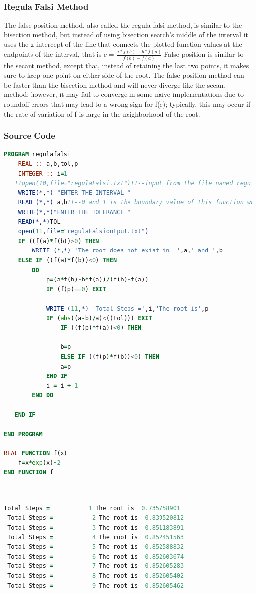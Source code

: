 \documentclass{article}
\begin{document}
\subsubsection{Regula Falsi Method}
The false position method, also called the regula falsi method, is similar to the bisection method, but instead of using bisection search's middle of the interval it uses the x-intercept of the line that connects the plotted function values at the endpoints of the interval, that is $ c = \frac{a*f(b)-b*f(a)}{f(b)-f(a)}$
False position is similar to the secant method, except that, instead of retaining the last two points, it makes sure to keep one point on either side of the root. The false position method can be faster than the bisection method and will never diverge like the secant method; however, it may fail to converge in some naive implementations due to roundoff errors that may lead to a wrong sign for f(c); typically, this may occur if the rate of variation of f is large in the neighborhood of the root.
\subsubsection{Source Code}
\begin{lstlisting}[language=Fortran,caption=Regula Falsi]
PROGRAM regulafalsi
    REAL :: a,b,tol,p
    INTEGER :: i=1
   !!open(10,file="regulaFalsi.txt")!!--input from the file named regula falsi.txt--!!
    WRITE(*,*) "ENTER THE INTERVAL "
    READ (*,*) a,b!!--0 and 1 is the boundary value of this function where the root lies and tol is tolerance upto--!!
    WRITE(*,*)"ENTER THE TOLERANCE "
    READ(*,*)TOL
    open(11,file="regulaFalsioutput.txt")
    IF ((f(a)*f(b))>0) THEN
        WRITE (*,*) 'The root does not exist in  ',a,' and ',b
    ELSE IF ((f(a)*f(b))<0) THEN
        DO
            p=(a*f(b)-b*f(a))/(f(b)-f(a))
            IF (f(p)==0) EXIT

            WRITE (11,*) 'Total Steps =',i,'The root is',p
            IF (abs((a-b)/a)<((tol))) EXIT
                IF ((f(p)*f(a))<0) THEN

                b=p
                ELSE IF ((f(p)*f(b))<0) THEN
                a=p
            END IF
            i = i + 1
        END DO

   END IF

END PROGRAM

REAL FUNCTION f(x)
    f=x*exp(x)-2
END FUNCTION f




\end{lstlisting}
\begin{lstlisting}[language=Fortran,caption=Bisection Method Output]
 Total Steps =           1 The root is  0.735758901    
 Total Steps =           2 The root is  0.839520812    
 Total Steps =           3 The root is  0.851183891    
 Total Steps =           4 The root is  0.852451563    
 Total Steps =           5 The root is  0.852588832    
 Total Steps =           6 The root is  0.852603674    
 Total Steps =           7 The root is  0.852605283    
 Total Steps =           8 The root is  0.852605402    
 Total Steps =           9 The root is  0.852605462    
 

\end{lstlisting}
\end{document}
